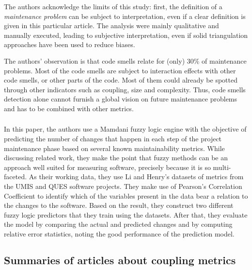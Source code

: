         The authors acknowledge the limits of this study: first, the definition of a \textit{maintenance problem} can be subject to interpretation, even if a clear definition is given in this particular article. The analysis were mainly qualitative and manually executed, leading to subjective interpretation, even if solid triangulation approaches have been used to reduce biases.
        
        The authors' observation is that code smells relate for (only) 30\% of maintenance problems. Most of the code smells are subject to interaction effects with other code smells, or other parts of the code. Most of them could already be spotted through other indicators such as coupling, size and complexity. Thus, code smells detection alone cannot furnish a global vision on future maintenance problems and has to be combined with other metrics.
    
    \subsubsection{ \cite{s13_maintainability}}
    
        In this paper, the authors use a Mamdani fuzzy logic engine with the objective of predicting the number of changes that happen in each step of the project maintenance phase based on several known maintainability metrics. While discussing related work, they make the point that fuzzy methods can be an approach well suited for measuring software, precisely because it is so multi-faceted. As their working data, they use Li and Henry's datasets of metrics from the UMIS and QUES software projects. They make use of Pearson’s Correlation Coefficient to identify which of the variables present in the data bear a relation to the changes to the software. Based on the result, they construct two different fuzzy logic predictors that they train using the datasets. After that, they evaluate the model by comparing the actual and predicted changes and by computing relative error statistics, noting the good performance of the prediction model.

\subsection{Summaries of articles about coupling metrics}

    \subsubsection{ \cite{s88_coupling}}
    
